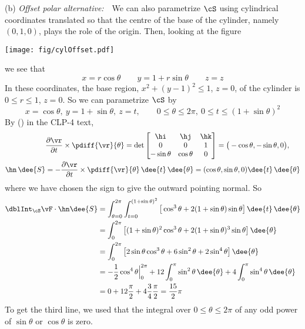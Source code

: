 \begin{solution}
(b) \emph{Offset polar alternative:}\ \ 
We can also parametrize $\cS$ using cylindrical coordinates translated so that the centre of the base of the cylinder, namely $(0,1,0)$, plays the role of
the origin. Then, looking at the figure

\begin{center}
     \texttt{[image: fig/cylOffset.pdf]}
\end{center}

we see that 
\begin{equation*}
x = r\cos\theta\qquad
y=1+r\sin\theta\qquad
z=z
\end{equation*}
In these coordinates, the base region, $x^2+(y-1)^2\le 1$, $z=0$, of
the cylinder is $0\le r\le 1$, $z=0$. So we can parametrize $\cS$ by
$$
x = \cos\theta,\ y=1+\sin\theta,\ z=t,
\qquad
0\le\theta\le2\pi,\
0\le t\le (1+\sin\theta)^2
$$
By () in the CLP-4 text,
\begin{align*}
&\frac{\partial\vr}{\partial t}\times\pdiff{\vr}{\theta}
= \det\left[\begin{matrix} \hi & \hj & \hk \\
0 & 0 & 1 \\
-\sin\theta & \cos\theta & 0 \end{matrix}\right]
= \big(-\cos\theta, -\sin\theta, 0\big),
\\
\hn\,\dee{S} &= -\frac{\partial\vr}{\partial t}\times
            \pdiff{\vr}{\theta}\,\dee{t}\,\dee{\theta}
= (\cos\theta,\sin\theta,0)\dee{t}\,\dee{\theta}
\end{align*}
where we have chosen the sign to give the outward pointing normal.
So
\begin{align*}
\dblInt_\cS\vF\cdot \hn\dee{S}
&= \int_{\theta=0}^{2\pi} \int_{t=0}^{(1+\sin\theta)^2}
\big[\cos^3\theta+2(1+\sin\theta)\sin\theta\big]\,\dee{t}\,\dee{\theta} \\
&= \int_0^{2\pi}
\big[ (1+\sin\theta)^2\cos^3\theta
+2(1+\sin\theta)^3\sin\theta\big]\,\dee{\theta} \\
&= \int_0^{2\pi}
\big[ 2\sin\theta\cos^3\theta
+6\sin^2\theta+2\sin^4\theta\big]\,\dee{\theta} \\
&=-\frac{1}{2}\cos^4\theta\Big|_0^{2\pi} 
   +12\int_0^\pi \sin^2\theta\,\dee{\theta}
   +4\int_0^\pi \sin^4\theta\,\dee{\theta} \\
&=0+12\frac{\pi}{2} +4\frac{3}{4}\frac{\pi}{2}
 = \frac{15}{2}\pi
\end{align*}
To get the third line, we used that the integral over $0\le\theta\le2\pi$
of any odd power of $\sin\theta$ or $\cos\theta$ is zero.
\end{solution}

